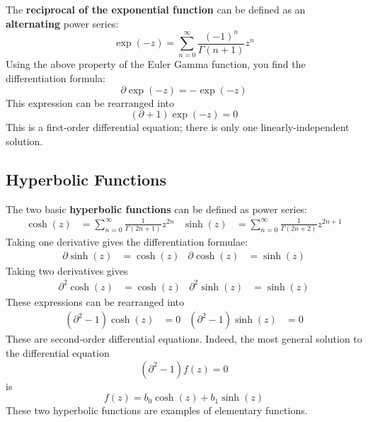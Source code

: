 The \textbf{reciprocal of the exponential function} can be defined as an \textbf{alternating} power series:
\begin{equation}
    \exp({-z}) = \sum_{n = 0}^{\infty} \frac{(-1)^{n}}{\Gamma(n + 1)} z^{n}
\end{equation}
Using the above property of the Euler Gamma function, you find the differentiation formula:
\begin{equation}
    \partial \exp({-z}) = -\exp({-z})
\end{equation}
This expression can be rearranged into
\begin{equation}
    \left( \partial + 1 \right) \exp({-z}) = 0
\end{equation}
This is a first-order differential equation; there is only one linearly-independent solution.
\subsection{Hyperbolic Functions}
The two basic \textbf{hyperbolic functions} can be defined as power series:
\begin{align}
    \cosh(z) &= \sum_{n = 0}^{\infty} \frac{1}{\Gamma(2n + 1)} z^{2n} & \sinh(z) &= \sum_{n = 0}^{\infty} \frac{1}{\Gamma(2n + 2)} z^{2n + 1}
\end{align}
Taking one derivative gives the differentiation formulae:
\begin{align}
    \partial \sinh(z) &= \cosh(z) & \partial \cosh(z) &= \sinh(z)
\end{align}
Taking two derivatives gives
\begin{align}
    \partial^{2} \cosh(z) &= \cosh(z) & \partial^{2} \sinh(z) &= \sinh(z)
\end{align}
These expressions can be rearranged into
\begin{align}
    \left( \partial^{2} - 1 \right) \cosh(z) &= 0 & \left( \partial^{2} - 1 \right) \sinh(z) &= 0
\end{align}
These are second-order differential equations. Indeed, the most general solution to the differential equation
\begin{equation}
    \left( \partial^{2} - 1 \right) f(z) = 0
\end{equation}
is
\begin{equation}
    f(z) = b_{0} \cosh(z) + b_{1} \sinh(z)
\end{equation}
These two hyperbolic functions are examples of elementary functions.
